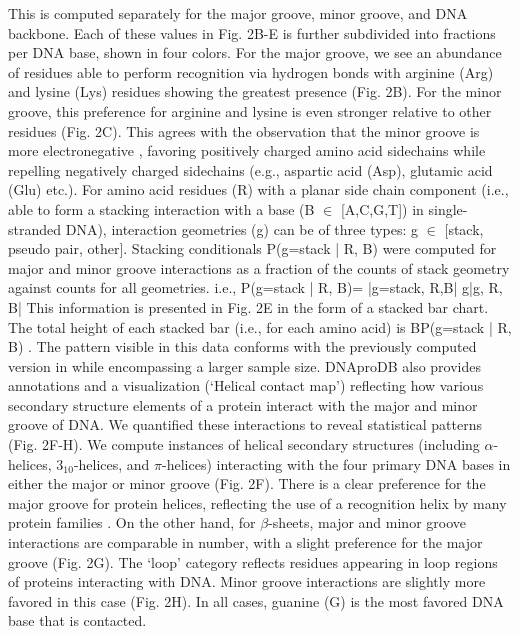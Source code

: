 This is computed separately for the major groove, minor groove, and DNA backbone. Each of these values in Fig. 2B-E is further subdivided into fractions per DNA base, shown in four colors. For the major groove, we see an abundance of residues able to perform recognition via hydrogen bonds with arginine (Arg) and lysine (Lys) residues showing the greatest presence (Fig. 2B). For the minor groove, this preference for arginine and lysine is even stronger relative to other residues (Fig. 2C). This agrees with the observation that the minor groove is more electronegative \citep{rohs2009role}, favoring positively charged amino acid sidechains while repelling negatively charged sidechains (e.g., aspartic acid (Asp), glutamic acid (Glu) etc.). 
For amino acid residues (R) with a planar side chain component (i.e., able to form a stacking interaction with a base (B $\in$ [A,C,G,T]) in single-stranded DNA), interaction geometries (g) can be of three types: g $\in$ [stack, pseudo pair, other]. Stacking conditionals P(g=stack | R, B) were computed for major and minor groove interactions as a fraction of the counts of stack geometry against counts for all geometries. i.e.,
P(g=stack | R, B)= |g=stack, R,B|  g|g, R, B| 
This information is presented in Fig. 2E in the form of a stacked bar chart. The total height of each stacked bar (i.e., for each amino acid) is BP(g=stack | R, B) . The pattern visible in this data conforms with the previously computed version in \citep{Sagendorf2020} while encompassing a larger sample size.
DNAproDB also provides annotations and a visualization (‘Helical contact map’) reflecting how various secondary structure elements of a protein interact with the major and minor groove of DNA. We quantified these interactions to reveal statistical patterns (Fig. 2F-H). We compute instances of helical secondary structures (including $\alpha$-helices, $3_{10}$-helices, and $\pi$-helices) interacting with the four primary DNA bases in either the major or minor groove (Fig. 2F). There is a clear preference for the major groove for protein helices, reflecting the use of a recognition helix by many protein families \citep{Garvie2001}. On the other hand, for $\beta$-sheets, major and minor groove interactions are comparable in number, with a slight preference for the major groove (Fig. 2G). The ‘loop’ category reflects residues appearing in loop regions of proteins interacting with DNA. Minor groove interactions are slightly more favored in this case (Fig. 2H). In all cases, guanine (G) is the most favored DNA base that is contacted. 

